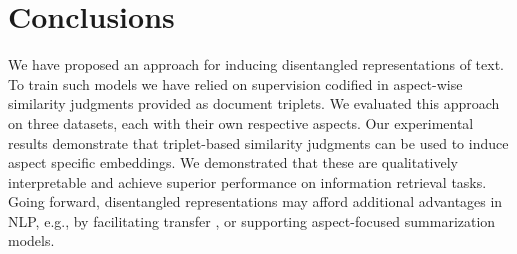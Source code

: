 \documentclass[11pt,a4paper]{article}
\begin{document}

\vspace{-.25em}
\section{Conclusions}
\vspace{-.5em}
We have proposed an approach for inducing disentangled representations of text. To train such models we have relied on supervision codified in aspect-wise similarity judgments provided as document triplets. We evaluated this approach on three datasets, each with their own respective aspects. Our experimental results demonstrate that triplet-based similarity judgments can be used to induce aspect specific embeddings. We demonstrated that these are qualitatively interpretable and achieve superior performance on information retrieval tasks. 
Going forward, disentangled representations may afford additional advantages in NLP, e.g., by facilitating transfer \cite{zhang2017aspect}, or supporting aspect-focused summarization models. 



\end{document}
